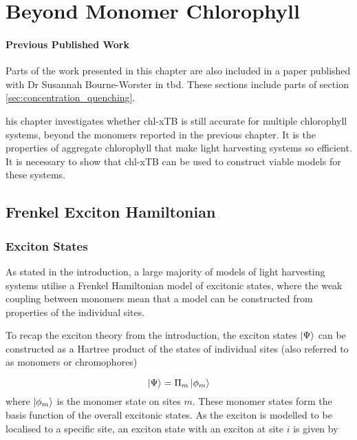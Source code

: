 %
%
\let\textcircled=\pgftextcircled
\chapter{Beyond Monomer Chlorophyll}
\label{chap:excitons}

\subsubsection*{Previous Published Work}
Parts of the work presented in this chapter are also included in a paper published 
with Dr Susannah Bourne-Worster in tbd. These sections include parts of section 
\ref{sec:concentration_quenching}.

his chapter investigates whether  chl-xTB is still accurate for multiple 
chlorophyll systems, beyond the monomers reported in the previous chapter. It is
the properties of aggregate chlorophyll that make light harvesting systems so efficient.
It is necessary to show that chl-xTB can be used to construct viable models for
these systems.

\section{Frenkel Exciton Hamiltonian}
\label{sec:exciton_theory}

\subsection{Exciton States}
\label{subsec:exciton_states}
As stated in the introduction, a large majority of models of light harvesting systems
utilise a Frenkel Hamiltonian model of excitonic states, where the weak coupling
between monomers mean that a model can be constructed from properties of the individual
sites.

To recap the exciton theory from the introduction, the exciton states $\ket{\Psi}$ can
be constructed as a Hartree product of the states of individual sites (also referred
to as monomers or chromophores)

\begin{equation}
    \ket{\Psi} = \Pi_m \ket{\phi_m}
\end{equation}
%
where $\ket{\phi_m}$ is the monomer state on sites $m$. These monomer states form
the basis function of the overall excitonic states. As the exciton is modelled to
be localised to a specific site, an exciton state with an exciton at site $i$ is
given by

